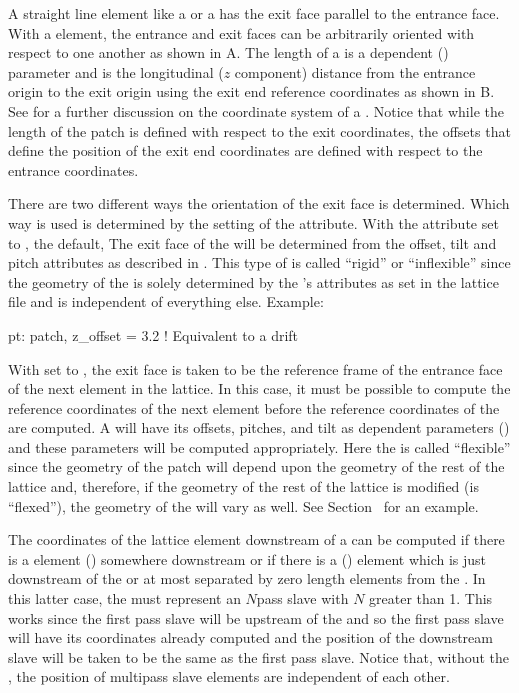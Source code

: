 {A straight line element like a  or a  has the exit face parallel to the
entrance face. With a  element, the entrance and exit faces can be arbitrarily oriented
with respect to one another as shown in A. The length  of a  is a
dependent () parameter and is the longitudinal ($z$ component) distance from the
entrance origin to the exit origin using the exit end reference coordinates as shown in
B. See  for a further discussion on the coordinate system of a
. Notice that while the length of the patch is defined with respect to the exit
coordinates, the offsets that define the position of the exit end coordinates are defined with
respect to the entrance coordinates.

There are two different ways the orientation of the exit face is determined. Which way is used is
determined by the setting of the  attribute.  With the  attribute set to
, the default, The exit face of the  will be determined from the offset, tilt
and pitch attributes as described in . This type of  is called
``rigid'' or ``inflexible'' since the geometry of the  is solely determined by the
's attributes as set in the lattice file and is independent of everything else.  Example:
\begin{example}
  pt: patch, z_offset = 3.2   ! Equivalent to a drift
\end{example}

With  set to , the exit face is taken to be the reference frame of the
entrance face of the next element in the lattice. In this case, it must be possible to compute the
reference coordinates of the next element before the reference coordinates of the  are
computed. A   will have its offsets, pitches, and tilt as dependent
parameters () and these parameters will be computed appropriately. Here the
 is called ``flexible'' since the geometry of the patch will depend upon the geometry of
the rest of the lattice and, therefore, if the geometry of the rest of the lattice is modified (is
``flexed''), the geometry of the  will vary as well. See Section~ for an
example.

The coordinates of the lattice element downstream of a   can be computed
if there is a  element () somewhere downstream or if there is a
 () element which is just downstream of the  or at
most separated by zero length elements from the . In this latter case, the
 must represent an $N$\Th pass slave with $N$ greater than 1. This works since
the first pass slave will be upstream of the  and so the first pass slave will have its
coordinates already computed and the position of the downstream slave will be taken to be the same
as the first pass slave. Notice that, without the , the position of multipass slave
elements are independent of each other.

}
